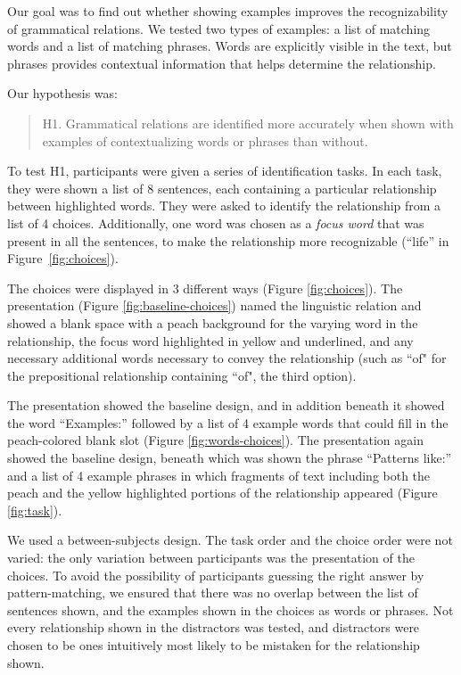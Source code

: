 

Our goal was to find out whether showing examples improves the recognizability of grammatical relations. We tested two types of examples: a list of matching words and a list of matching phrases. Words are explicitly visible in the text, but phrases provides contextual information that helps determine the relationship.

Our hypothesis was:
\begin{quote}
	H1. Grammatical relations are identified more accurately when shown with examples of contextualizing words or phrases than without.
\end{quote}

To test H1, participants were given a series of identification tasks. In each task, they were shown a list of 8 sentences, each containing a particular relationship between highlighted words. They were asked to identify the relationship from a list of 4 choices.  Additionally, one word was chosen as a \emph{focus word} that was present in all the sentences, to make the relationship more recognizable (``life'' in Figure~\ref{fig:choices}).

The choices were displayed in 3 different ways (Figure \ref{fig:choices}).  The  presentation
(Figure \ref{fig:baseline-choices}) named the linguistic relation and showed a blank space with a peach background for the varying word in the relationship, the focus word highlighted in yellow and underlined, and any necessary additional words necessary to convey the relationship (such as ``of" for the prepositional relationship containing ``of",  the third option).

The  presentation showed the baseline design, and in addition beneath it showed the word ``Examples:'' followed by a list of 4 example words that could fill in the peach-colored blank slot (Figure \ref{fig:words-choices}).   The  presentation again showed the baseline design, beneath which was shown the phrase ``Patterns like:'' and a list of 4 example phrases in which fragments of text including both the peach and the yellow highlighted portions of the  relationship appeared (Figure \ref{fig:task}).

We used a between-subjects design. The task order and the choice order were not varied: the only variation between participants was the presentation of the choices. To avoid the possibility of participants guessing the right answer by pattern-matching, we ensured that there was no overlap between the list of sentences shown, and the examples shown in the choices as words or phrases. Not every relationship shown in the distractors was tested, and distractors were chosen to be ones intuitively most likely to be mistaken for  the relationship shown.

